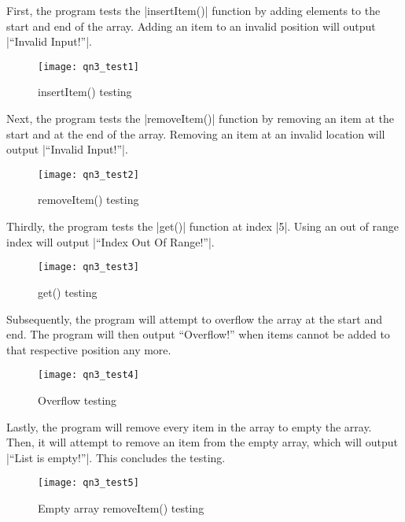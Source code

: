 \documentclass{report}
\begin{document}
First, the program tests the |insertItem()| function by adding elements to the start and end of the array. Adding an item to an invalid position will output |``Invalid Input!''|.
\begin{figure}[H]
	\centering
	\caption{insertItem() testing}
	\texttt{[image: qn3\_test1]}
	\label{fig:qn3_insertitem}
\end{figure}

Next, the program tests the |removeItem()| function by removing an item at the start and at the end of the array. Removing an item at an invalid location will output |``Invalid Input!''|.
\begin{figure}[H]
	\centering
	\caption{removeItem() testing}
	\texttt{[image: qn3\_test2]}
	\label{fig:qn3_removeitem}
\end{figure}

Thirdly, the program tests the |get()| function at index |5|. Using an out of range index will output |``Index Out Of Range!''|.
\begin{figure}[H]
	\centering
	\caption{get() testing}
	\texttt{[image: qn3\_test3]}
	\label{fig:qn3_get}
\end{figure}

Subsequently, the program will attempt to overflow the array at the start and end. The program will then output ``Overflow!'' when items cannot be added to that respective position any more.
\begin{figure}[H]
	\centering
	\caption{Overflow testing}
	\texttt{[image: qn3\_test4]}
	\label{fig:qn3_overflow}
\end{figure}

Lastly, the program will remove every item in the array to empty the array. Then, it will attempt to remove an item from the empty array, which will output |``List is empty!''|. This concludes the testing.
\begin{figure}[H]
	\centering
	\caption{Empty array removeItem() testing}
	\texttt{[image: qn3\_test5]}
	\label{fig:qn3_emptyarray}
\end{figure}
\end{document}
